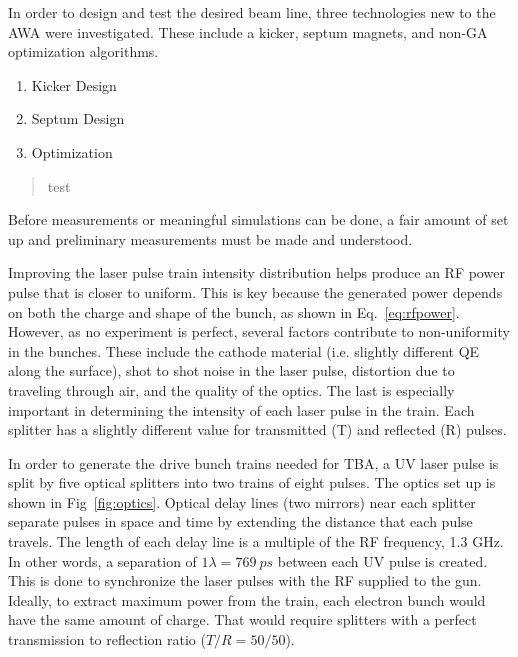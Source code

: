 \documentclass{iitthesis}
\begin{document}

 \label{sec:requirements}

In order to design and test the desired beam line, three technologies 
new to the AWA were investigated. These include a kicker, septum magnets, 
and non-GA optimization algorithms.

\begin{enumerate}
	\item Kicker Design
	\item Septum Design
	\item Optimization 
\end{enumerate}

\begin{quotation}
	test
\end{quotation}

\clearpage


Before measurements or meaningful simulations can be done, 
a fair amount of set up and preliminary measurements 
must be made and understood. 

 \label{sec:uvoptics}
Improving the laser pulse train intensity distribution helps
produce an RF power pulse that is closer to uniform. This is key because the generated power depends on both the 
charge and shape of the bunch, as shown in Eq.~\ref{eq:rfpower}. However, as no experiment is perfect, 
several factors contribute to non-uniformity in the bunches. These include the cathode material
(i.e. slightly different QE along the surface), shot to shot noise in the laser pulse, 
distortion due to traveling through air, and the quality of the optics. The last is especially important 
in determining the intensity of each laser pulse in the train.  
Each splitter has a slightly different value for transmitted (T) and reflected (R) pulses. 

In order to generate the drive bunch trains needed for TBA, a UV laser pulse is split 
by five optical splitters into two trains of eight pulses. 
The optics set up is shown in Fig~\ref{fig:optics}. Optical delay lines (two mirrors) near each splitter 
separate pulses in space and time by extending the distance that each pulse travels. 
The length of each delay line is a multiple of the RF frequency, 1.3 GHz. 
In other words, a separation of $1\lambda=\SI{769}{ps}$ between each UV pulse is created. 
This is done to synchronize the laser pulses with the RF supplied to the gun.
Ideally, to extract maximum power from the train, each electron bunch would have the same amount of charge. 
That would require splitters with a perfect transmission to reflection ratio ($T/R = 50/50$).
\end{document}
